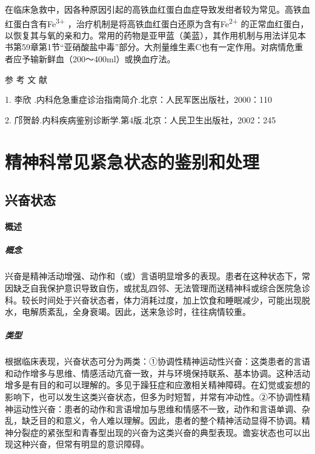 在临床急救中，因各种原因引起的高铁血红蛋白血症导致发绀者较为常见。高铁血红蛋白含有Fe\textsuperscript{3+}
，治疗机制是将高铁血红蛋白还原为含有Fe\textsuperscript{2+}
的正常血红蛋白，以恢复其与氧的亲和力。常用的药物是亚甲蓝（美蓝），其作用机制与用法详见本书第59章第1节“亚硝酸盐中毒”部分。大剂量维生素C也有一定作用。对病情危重者应予输新鲜血（200～400ml）或换血疗法。


\hypertarget{text00042.htmlux5cux23CHP1-17-4}{}
参 考 文 献

1. 李欣 .内科危急重症诊治指南简介.北京：人民军医出版社，2000：110

2. 邝贺龄.内科疾病鉴别诊断学.第4版.北京：人民卫生出版社，2002：245

\protect\hypertarget{text00043.html}{}{}

\chapter{精神科常见紧急状态的鉴别和处理}

\section{兴奋状态}

\subsubsection{概述}

\paragraph{概念}

兴奋是精神活动增强、动作和（或）言语明显增多的表现。患者在这种状态下，常因缺乏自我保护意识导致自伤，或扰乱四邻、无法管理而送精神科或综合医院急诊科。较长时间处于兴奋状态者，体力消耗过度，加上饮食和睡眠减少，可能出现脱水，电解质紊乱，全身衰竭。因此，送来急诊时，往往病情较重。

\paragraph{类型}

根据临床表现，兴奋状态可分为两类：①协调性精神运动性兴奋：这类患者的言语和动作增多与思维、情感活动亢奋一致，并与环境保持联系、基本协调。这种活动增多是有目的和可以理解的。多见于躁狂症和应激相关精神障碍。在幻觉或妄想的影响下，也可以发生这类兴奋状态，但多为时短暂，并常有冲动性。②不协调性精神运动性兴奋：患者的动作和言语增加与思维和情感不一致，动作和言语单调、杂乱，缺乏目的和意义，令人难以理解。因此，患者的整个精神活动显得不协调。精神分裂症的紧张型和青春型出现的兴奋为这类兴奋的典型表现。谵妄状态也可以出现这种兴奋，但常有明显的意识障碍。

